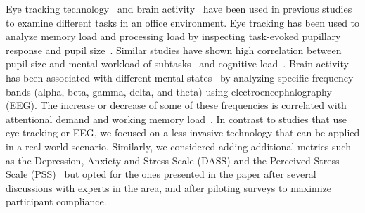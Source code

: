 Eye tracking technology~\cite{Bednarik2006,Crosby1990,Rodeghero2014} and brain activity~\cite{Ikutani2014,Siegmund2014} 
have been used in previous studies to examine different tasks in an office environment.
Eye tracking has been used to analyze memory load and processing load by inspecting task-evoked pupillary response and pupil size~\cite{beatty82}. Similar studies have shown high correlation between pupil size and mental workload of subtasks~\cite{beatty82} and cognitive load~\cite{Klingner10}.
Brain activity has been associated with different mental states~\cite{Berger29} by analyzing specific frequency bands (alpha, beta, gamma, delta, and theta) using electroencephalography (EEG). The increase or decrease of some of these frequencies is correlated with
attentional demand and working memory load~\cite{Smith05,sterman93}.
In contrast to studies that use eye tracking or EEG, we focused on a less invasive technology that can be applied in a real world scenario.
Similarly, we considered adding additional metrics such as the Depression, Anxiety and Stress Scale (DASS) and the Perceived Stress Scale (PSS)~\cite{Ferdous15} but opted for the ones presented in the paper after several discussions with experts in the area, and after piloting surveys to maximize participant compliance.


